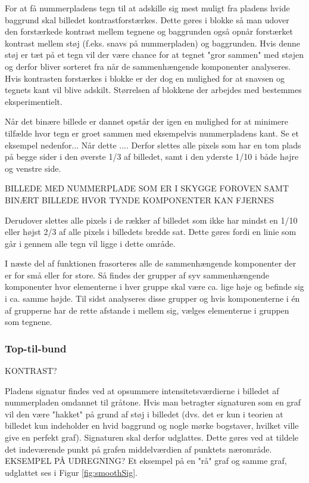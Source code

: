 For at få nummerpladens tegn til at adskille sig mest muligt fra pladens hvide baggrund skal billedet kontrastforstærkes. Dette gøres i blokke så man udover den forstærkede kontrast mellem tegnene og baggrunden også opnår forstærket kontrast mellem støj (f.eks. snavs på nummerpladen) og baggrunden. Hvis denne støj er tæt på et tegn vil der være chance for at tegnet "gror sammen" med støjen og derfor bliver sorteret fra når de sammenhængende komponenter analyseres. Hvis kontrasten forstærkes i blokke er der dog en mulighed for at snavsen og tegnets kant vil blive adskilt. Størrelsen af blokkene der arbejdes med bestemmes eksperimentielt.

Når det binære billede er dannet opstår der igen en mulighed for at minimere tilfælde hvor tegn er groet sammen med eksempelvis nummerpladens kant. Se et eksempel nedenfor... Når dette .... Derfor slettes alle pixels som har en tom plads på begge sider i den øverste 1/3 af billedet, samt i den yderste 1/10 i både højre og venstre side.

BILLEDE MED NUMMERPLADE SOM ER I SKYGGE FOROVEN SAMT BINÆRT BILLEDE HVOR TYNDE KOMPONENTER KAN FJERNES

Derudover slettes alle pixels i de rækker af billedet som ikke har mindst en 1/10 eller højst 2/3 af alle pixels i billedets bredde sat. Dette gøres fordi en linie som går i gennem alle tegn vil ligge i dette område.

I næste del af funktionen frasorteres alle de sammenhængende komponenter der er for små eller for store. Så findes der grupper af syv sammenhængende komponenter hvor elementerne i hver gruppe skal være ca. lige høje og befinde sig i ca. samme højde. Til sidst analyseres disse grupper og hvis komponenterne i én af grupperne har de rette afstande i mellem sig, vælges elementerne i gruppen som tegnene.

\subsubsection*{Top-til-bund}

KONTRAST?

Pladens signatur findes ved at opsummere intensitetsværdierne i billedet af nummerpladen omdannet til gråtone. Hvis man betragter signaturen som en graf vil den være "hakket" på grund af støj i billedet (dvs. det er kun i teorien at billedet kun indeholder en hvid baggrund og nogle mørke bogstaver, hvilket ville give en perfekt graf). Signaturen skal derfor udglattes. Dette gøres ved at tildele det indeværende punkt på grafen middelværdien af punktets nærområde. EKSEMPEL PÅ UDREGNING? Et eksempel på en "rå" graf og samme graf, udglattet ses i Figur \vref{fig:smoothSig}.

